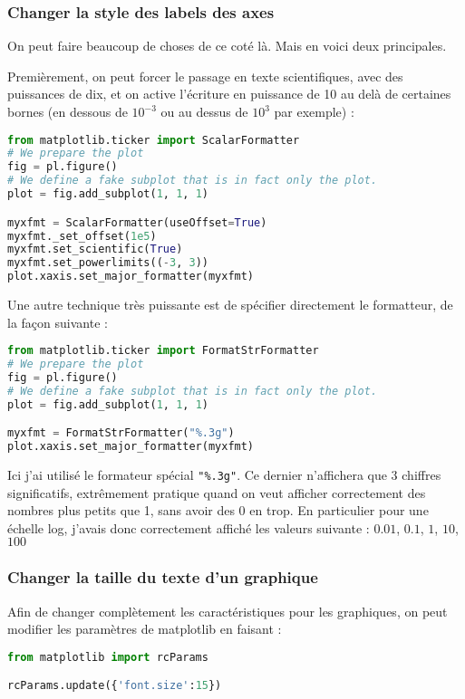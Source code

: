 \documentclass[a4paper,twoside]{article}
\begin{document}
\subsubsection{Changer la style des labels des axes}
On peut faire beaucoup de choses de ce coté là. Mais en voici deux principales. 

Premièrement, on peut forcer le passage en texte scientifiques, avec des puissances de dix, et on active l'écriture en puissance de 10 au delà de certaines bornes (en dessous de $10^{-3}$ ou au dessus de $10^3$ par exemple) : 
\begin{lstlisting}[language=python]
from matplotlib.ticker import ScalarFormatter
# We prepare the plot
fig = pl.figure()
# We define a fake subplot that is in fact only the plot.
plot = fig.add_subplot(1, 1, 1)

myxfmt = ScalarFormatter(useOffset=True)
myxfmt._set_offset(1e5)
myxfmt.set_scientific(True)
myxfmt.set_powerlimits((-3, 3)) 
plot.xaxis.set_major_formatter(myxfmt)
\end{lstlisting}

\bigskip

Une autre technique très puissante est de spécifier directement le formatteur, de la façon suivante : 
\begin{lstlisting}[language=python]
from matplotlib.ticker import FormatStrFormatter
# We prepare the plot
fig = pl.figure()
# We define a fake subplot that is in fact only the plot.
plot = fig.add_subplot(1, 1, 1)

myxfmt = FormatStrFormatter("%.3g")
plot.xaxis.set_major_formatter(myxfmt)
\end{lstlisting}

Ici j'ai utilisé le formateur spécial \verb|"%.3g"|. Ce dernier n'affichera que 3 chiffres significatifs, extrêmement pratique quand on veut afficher correctement des nombres plus petits que 1, sans avoir des 0 en trop. En particulier pour une échelle log, j'avais donc correctement affiché les valeurs suivante : $0.01$, $0.1$, $1$, $10$, $100$

\subsubsection{Changer la taille du texte d'un graphique}
Afin de changer complètement les caractéristiques pour les graphiques, on peut modifier les paramètres de matplotlib en faisant : 
\begin{lstlisting}[language=python]
from matplotlib import rcParams

rcParams.update({'font.size':15})
\end{lstlisting}
\end{document}
